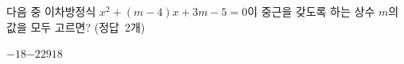 다음 중 이차방정식 $x^2+(m-4)x+3m-5=0$이 중근을 갖도록 하는 상수 $m$의 값을 모두 고르면? \mbox{(정답 2개)}
\begin{choices32}{$-18$}{$-2$}{$2$}{$9$}{$18$}\end{choices32}
